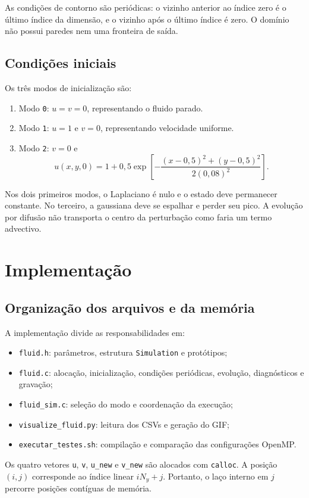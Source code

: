 \documentclass[12pt,a4paper]{article}
\begin{document}
As condições de contorno são periódicas: o vizinho anterior ao índice zero é o último índice da dimensão, e o vizinho após o último índice é zero. O domínio não possui paredes nem uma fronteira de saída.



\subsection{Condições iniciais}
Os três modos de inicialização são:
\begin{enumerate}
    \item Modo \texttt{0}: $u=v=0$, representando o fluido parado.
    \item Modo \texttt{1}: $u=1$ e $v=0$, representando velocidade uniforme.
    \item Modo \texttt{2}: $v=0$ e
    \[
    u(x,y,0)=1+0{,}5
    \exp\left[-\frac{(x-0{,}5)^2+(y-0{,}5)^2}{2(0{,}08)^2}\right].
    \]
\end{enumerate}
Nos dois primeiros modos, o Laplaciano é nulo e o estado deve permanecer constante. No terceiro, a gaussiana deve se espalhar e perder seu pico. A evolução por difusão não transporta o centro da perturbação como faria um termo advectivo.

\section{Implementação}
\subsection{Organização dos arquivos e da memória}
A implementação divide as responsabilidades em:
\begin{itemize}
    \item \texttt{fluid.h}: parâmetros, estrutura \texttt{Simulation} e protótipos;
    \item \texttt{fluid.c}: alocação, inicialização, condições periódicas, evolução, diagnósticos e gravação;
    \item \texttt{fluid\_sim.c}: seleção do modo e coordenação da execução;
    \item \texttt{visualize\_fluid.py}: leitura dos CSVs e geração do GIF;
    \item \texttt{executar\_testes.sh}: compilação e comparação das configurações OpenMP.
\end{itemize}
Os quatro vetores \texttt{u}, \texttt{v}, \texttt{u\_new} e \texttt{v\_new} são alocados com \texttt{calloc}. A posição $(i,j)$ corresponde ao índice linear $iN_y+j$. Portanto, o laço interno em $j$ percorre posições contíguas de memória.
\end{document}
